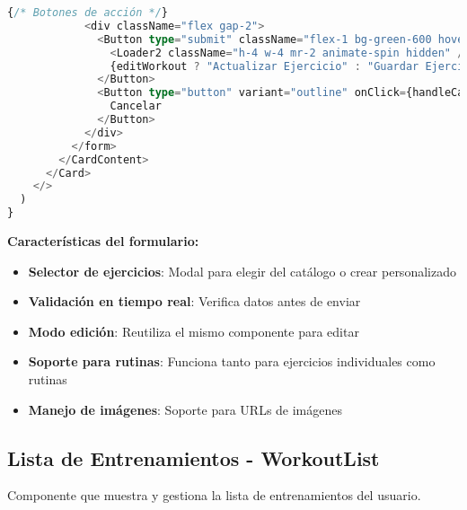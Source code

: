 \documentclass[12pt,a4paper]{article}
\begin{document}
\begin{lstlisting}[language=typescript, caption=components/gym/workout-form.tsx - Estructura principal]
            {/* Botones de acción */}
            <div className="flex gap-2">
              <Button type="submit" className="flex-1 bg-green-600 hover:bg-green-700">
                <Loader2 className="h-4 w-4 mr-2 animate-spin hidden" />
                {editWorkout ? "Actualizar Ejercicio" : "Guardar Ejercicio"}
              </Button>
              <Button type="button" variant="outline" onClick={handleCancel}>
                Cancelar
              </Button>
            </div>
          </form>
        </CardContent>
      </Card>
    </>
  )
}
\end{lstlisting}

\textbf{Características del formulario:}
\begin{itemize}
    \item \textbf{Selector de ejercicios}: Modal para elegir del catálogo o crear personalizado
    \item \textbf{Validación en tiempo real}: Verifica datos antes de enviar
    \item \textbf{Modo edición}: Reutiliza el mismo componente para editar
    \item \textbf{Soporte para rutinas}: Funciona tanto para ejercicios individuales como rutinas
    \item \textbf{Manejo de imágenes}: Soporte para URLs de imágenes
\end{itemize}

\subsection{Lista de Entrenamientos - WorkoutList}

Componente que muestra y gestiona la lista de entrenamientos del usuario.
\end{document}
